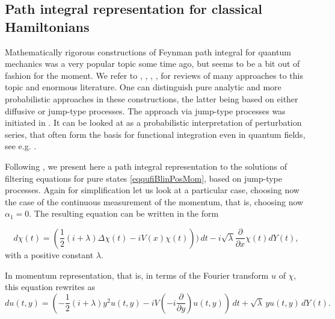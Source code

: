 \documentclass[12pt]{article}
\def\al{\alpha}
\def\pa{\partial}
\newcommand{\la}{\lambda}
\newcommand{\De}{\Delta}
\begin{document}
\subsection{Path integral representation for classical Hamiltonians}

Mathematically rigorous constructions of Feynman path integral for quantum mechanics
was a very popular topic some time ago, but seems to be a bit out of fashion for the moment.
We refer to \cite{Mazz}, \cite{Kol02}, \cite{KolBook00}, \cite{Shav}, \cite{Smol} for reviews of many approaches
to this topic and enormous literature. One can distinguish pure analytic
and more probabilistic approaches in these constructions,
the latter being based on either diffusive or jump-type processes. The approach via jump-type processes was
initiated in \cite{Mas}. It can be looked at as a probabilistic interpretation of
perturbation series, that often form the basis for functional integration even in quantum fields,
see e.g. \cite{SF}.

Following \cite{Kol02}, we present here a path integral representation to the solutions
of filtering equations for pure states
\eqref{eqqufiBlinPosMom},  based on jump-type processes.
Again for simplification let us look at a particular case,
choosing now the case of the continuous measurement of the momentum, that is, choosing now $\al_1=0$.
The resulting equation can be written in the form

\begin{equation}
\label{eqqufiBlinMom}
d\chi(t) =\left(\frac12 (i+\la)\De \chi(t) -iV(x) \chi(t)\right))\,dt
- i \sqrt \la\frac{\pa}{\pa x} \chi(t) dY(t),
\end{equation}
with a positive constant $\la$.

In  momentum representation, that is, in terms of the Fourier transform $u$ of $\chi$,
this equation rewrites as
\begin{equation}
\label{eqqufiBlinMomFour}
du(t,y)=\left(-\frac12 (i+\lambda)y^2 u(t,y)
-i V (-i \frac{\pa}{ \pa y})u(t,y)\right)\, dt
+\sqrt{\la}\, yu(t,y) \, dY(t).
\end{equation}
\end{document}
